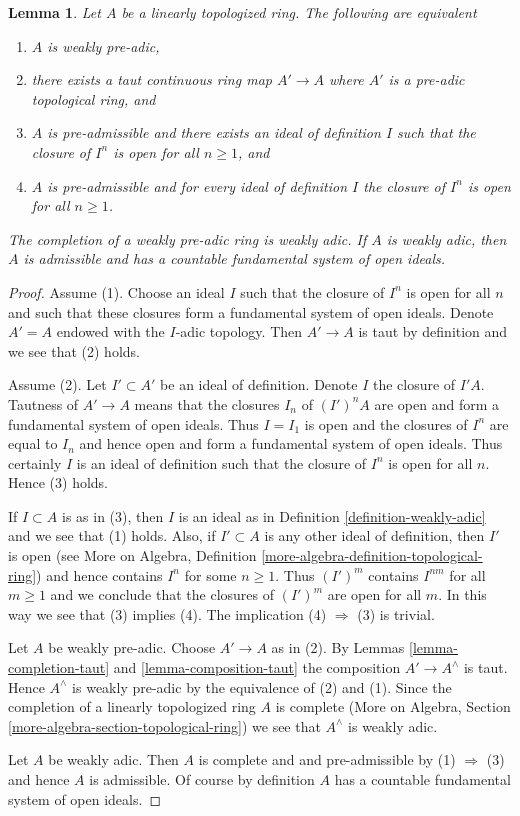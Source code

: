 \documentclass{stacks-project}
\theoremstyle{plain}
\newtheorem{lemma}[subsection]{Lemma}
\theoremstyle{definition}
\theoremstyle{remark}
\numberwithin{equation}{subsection}
\begin{document}
\begin{lemma}
\label{lemma-weakly-adic}
Let $A$ be a linearly topologized ring. The following are equivalent
\begin{enumerate}
\item $A$ is weakly pre-adic,
\item there exists a taut continuous ring map $A' \to A$
where $A'$ is a pre-adic topological ring, and
\item $A$ is pre-admissible and there exists an ideal of definition $I$
such that the closure of $I^n$ is open for all $n \geq 1$, and
\item $A$ is pre-admissible and for every ideal of definition $I$
the closure of $I^n$ is open for all $n \geq 1$.
\end{enumerate}
The completion of a weakly pre-adic ring is weakly adic.
If $A$ is weakly adic, then $A$ is admissible and has a countable
fundamental system of open ideals.
\end{lemma}

\begin{proof}
Assume (1). Choose an ideal $I$ such that the closure
of $I^n$ is open for all $n$ and such that these closures form
a fundamental system of open ideals. Denote $A' = A$ endowed with
the $I$-adic topology. Then $A' \to A$ is taut by definition and
we see that (2) holds.

\medskip\noindent
Assume (2). Let $I' \subset A'$ be an ideal of definition.
Denote $I$ the closure of $I'A$. Tautness of $A' \to A$ means
that the closures $I_n$ of $(I')^nA$ are open and form a fundamental system of
open ideals. Thus $I = I_1$ is open and the closures of $I^n$
are equal to $I_n$ and hence open and form a fundamental system of
open ideals. Thus certainly $I$ is an ideal of definition
such that the closure of $I^n$ is open for all $n$. Hence (3) holds.

\medskip\noindent
If $I \subset A$ is as in (3), then $I$ is an ideal as in
Definition \ref{definition-weakly-adic} and we see that (1) holds.
Also, if $I' \subset A$ is any other ideal of definition, then
$I'$ is open (see More on Algebra, Definition
\ref{more-algebra-definition-topological-ring})
and hence contains $I^n$ for some $n \geq 1$.
Thus $(I')^m$ contains $I^{nm}$ for all $m \geq 1$ and we
conclude that the closures of $(I')^m$ are open for all $m$.
In this way we see that (3) implies (4).
The implication (4) $\Rightarrow$ (3) is trivial.

\medskip\noindent
Let $A$ be weakly pre-adic. Choose $A' \to A$ as in (2).
By Lemmas \ref{lemma-completion-taut} and
\ref{lemma-composition-taut}
the composition $A' \to A^\wedge$ is taut. Hence $A^\wedge$
is weakly pre-adic by the equivalence of (2) and (1).
Since the completion of a linearly topologized ring $A$ is complete
(More on Algebra, Section \ref{more-algebra-section-topological-ring})
we see that $A^\wedge$ is weakly adic.

\medskip\noindent
Let $A$ be weakly adic. Then $A$ is complete and
and pre-admissible by (1) $\Rightarrow$ (3) and hence $A$
is admissible. Of course by definition $A$ has a countable
fundamental system of open ideals.
\end{proof}
\end{document}
